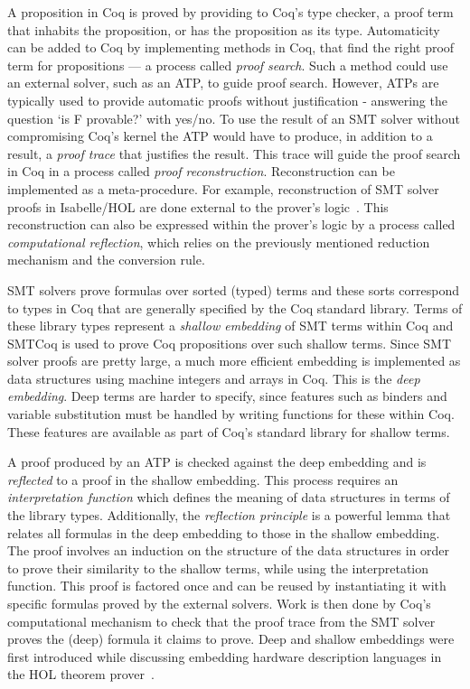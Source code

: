 \documentclass{article}
\begin{document}
	A proposition in Coq is proved by 
	providing to Coq's type checker, a 
	proof term that inhabits the 
	proposition, or has the proposition 
	as its type. Automaticity can be 
	added to Coq by implementing 
	methods in Coq, that find the right 
	proof term for propositions --- a 
	process called \textit{proof search}. 
	Such a method could use an external 
	solver, such as an ATP, to guide 
	proof search. However, ATPs are 
	typically used to provide automatic 
	proofs without justification - 
	answering the question `is F 
	provable?' with	yes/no. To use the 
	result of an SMT solver without 
	compromising Coq's kernel the ATP 
	would have to produce, in addition 
	to a result, a \textit{proof trace} 
	that justifies the result. This 
	trace will guide the proof search 
	in Coq in a process called 
	\textit{proof reconstruction}. 
	Reconstruction can be implemented 
	as a meta-procedure. For example, 
	reconstruction of SMT solver proofs 
	in Isabelle/HOL are done external to 
	the prover's logic~\cite{bohme}. 
	This reconstruction can also be 
	expressed within the prover's logic 
	by a process called 
	\textit{computational reflection}, 
	which relies on the previously 
	mentioned reduction mechanism and 
	the conversion rule.

	SMT solvers prove formulas over 
	sorted (typed) terms and these 
	sorts correspond to types in 
	Coq that are generally 
	specified by the Coq standard 
	library. Terms of these library 
	types represent a \textit{shallow 
	embedding} of SMT terms within 
	Coq and SMTCoq is used to prove 
	Coq propositions over such 
	shallow terms. Since SMT solver 
	proofs are pretty large, a much 
	more efficient embedding is 
	implemented as data structures 
	using machine integers and arrays 
	in Coq. This is the 
	\textit{deep embedding}. Deep 
	terms are harder to specify, 
	since features such as binders 
	and variable substitution must be 
	handled by writing functions 
	for these within Coq. These 
	features are available as part 
	of Coq's standard library 
	for shallow terms. 
	
	A proof produced by an 
	ATP is checked against the deep 
	embedding and is
	\textit{reflected} to a proof 
	in the shallow embedding. This 
	process requires an 
	\textit{interpretation function}
	which defines the meaning of 
	data structures in terms of 
	the library types. Additionally, 
	the \textit{reflection principle} 
	is a powerful lemma that relates 
	all formulas in the deep embedding
	to those in the shallow embedding. 
	The proof involves an induction 
	on the structure of the 
	data structures in order to prove 
	their similarity to 
	the shallow terms, while using 
	the interpretation function. This 
	proof is factored once and can be 
	reused by instantiating it with 
	specific formulas proved by the 
	external solvers. Work is then 
	done by Coq's computational 
	mechanism to check that the proof 
	trace from the SMT solver proves 
	the (deep) formula it claims to 
	prove. Deep and shallow 
	embeddings were first introduced 
	while discussing embedding 
	hardware description languages 
	in the HOL theorem 
	prover~\cite{10.5555/645902.672777}.
	
\end{document}
